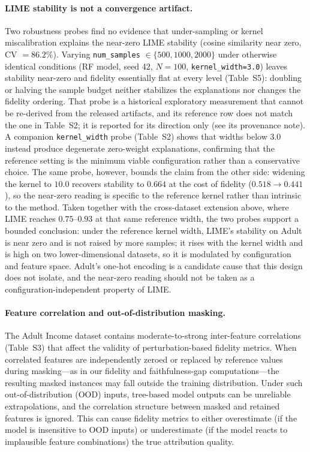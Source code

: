 \documentclass[fleqn,10pt,lineno]{wlpeerj}
\begin{document}
\paragraph{LIME stability is not a convergence artifact.}
Two robustness probes find no evidence that under-sampling or kernel
miscalibration explains the near-zero LIME stability (cosine similarity near
zero, CV $= 86.2\%$). Varying \texttt{num\_samples} $\in
\{500, 1000, 2000\}$ under otherwise identical conditions (RF model, seed
42, $N=100$, \texttt{kernel\_width=3.0}) leaves stability near-zero and
fidelity essentially flat at every level (Table~S5):
doubling or halving the sample budget neither stabilizes the explanations
nor changes the fidelity ordering. That probe is a historical exploratory
measurement that cannot be re-derived from the released artifacts, and its
reference row does not match the one in Table~S2; it is reported for its
direction only (see its provenance note). A companion \texttt{kernel\_width}
probe (Table~S2) shows that widths below $3.0$ instead
produce degenerate zero-weight explanations, confirming that the
reference setting is the minimum viable configuration rather than a
conservative choice. The same probe, however, bounds the claim from the
other side: widening the kernel to $10.0$ recovers stability to $0.664$
at the cost of fidelity ($0.518 \rightarrow 0.441$), so the near-zero
reading is specific to the reference kernel rather than intrinsic to the
method. Taken together with the cross-dataset extension above, where LIME
reaches $0.75$--$0.93$ at that same reference width, the two probes
support a bounded conclusion: under the reference kernel width, LIME's
stability on Adult is near zero and is not raised by more samples; it rises
with the kernel width and is high on two lower-dimensional datasets, so it
is modulated by configuration and feature space. Adult's one-hot encoding
is a candidate cause that this design does not isolate, and the near-zero
reading should not be taken as a configuration-independent property of
LIME.

\paragraph{Feature correlation and out-of-distribution masking.}
The Adult Income dataset contains moderate-to-strong inter-feature
correlations (Table~S3) that affect the validity of
perturbation-based fidelity metrics. When correlated features are
independently zeroed or replaced by reference values during
masking---as in our fidelity and faithfulness-gap computations---the
resulting masked instances may fall outside the training distribution.
Under such out-of-distribution (OOD) inputs, tree-based model outputs can
be unreliable extrapolations, and the correlation structure between
masked and retained features is ignored. This can cause fidelity metrics
to either overestimate (if the model is insensitive to OOD inputs) or
underestimate (if the model reacts to implausible feature combinations)
the true attribution quality.
\end{document}
